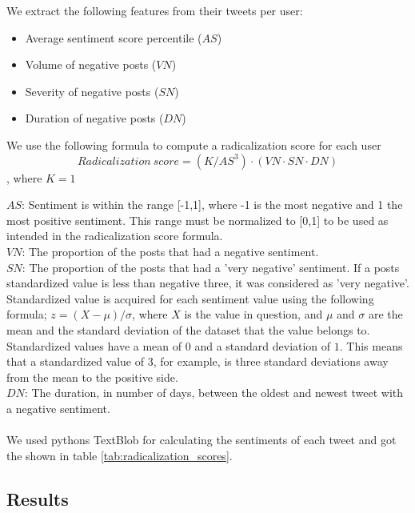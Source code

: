 \documentclass[conference]{IEEEtran}
\begin{document}
We extract the following features from their tweets per user:
\begin{itemize}
  \item Average sentiment score percentile (\(AS\))
  \item Volume of negative posts (\(VN\))
  \item Severity of negative posts (\(SN\))
  \item Duration of negative posts (\(DN\))
\end{itemize}
We use the following formula to compute a radicalization score for each user
\[Radicalization\: score = (K /AS^3) \cdot (VN \cdot SN \cdot DN)\], where \(K = 1\)


\(AS\): Sentiment is within the range [-1,1], where -1 is the most negative and 1 the most positive sentiment.
 This range must be normalized to [0,1] to be used as intended in the radicalization score formula.\\ %
\(VN\): The proportion of the posts that had a negative sentiment.\\
\(SN\): The proportion of the posts that had a 'very negative' sentiment. If a posts standardized value is less than negative three, it was considered as 'very negative'.
Standardized value is acquired for each sentiment value using the following formula;
\(z = (X - \mu)/\sigma\), where \(X\) is the value in question, and \(\mu\) and \(\sigma\) are the mean and the standard deviation of the dataset that the value belongs to. Standardized values have a mean of \(0\) and a standard deviation of \(1\). This means that a standardized value of 3, for example, is three standard deviations away from the mean to the positive side.\\
\(DN\): The duration, in number of days, between the oldest and newest tweet with a negative sentiment. \\
\\
We used pythons TextBlob for calculating the sentiments of each tweet and got the shown in table \ref{tab:radicalization_scores}.

\subsection{Results}
\end{document}
